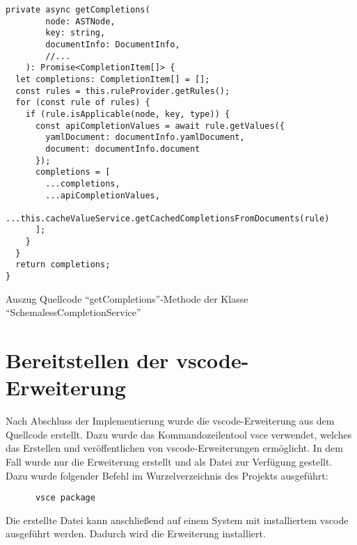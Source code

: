 \begin{listing}[t]
  \begin{verbatim}
private async getCompletions(
        node: ASTNode,
        key: string,
        documentInfo: DocumentInfo,
        //...
    ): Promise<CompletionItem[]> {
  let completions: CompletionItem[] = [];
  const rules = this.ruleProvider.getRules();
  for (const rule of rules) {
    if (rule.isApplicable(node, key, type)) {
      const apiCompletionValues = await rule.getValues({
        yamlDocument: documentInfo.yamlDocument,
        document: documentInfo.document
      });
      completions = [
        ...completions,
        ...apiCompletionValues,
        ...this.cacheValueService.getCachedCompletionsFromDocuments(rule)
      ];
    }
  }
  return completions;
}
      \end{verbatim}
  \caption{Auszug Quellcode ``getCompletions''-Methode der Klasse ``SchemalessCompletionService''}
  \label{lst:get-completions-schemaless-completion-service}
\end{listing}

\FloatBarrier

\section{Bereitstellen der \acs{vscode}-Erweiterung}

Nach Abschluss der Implementierung wurde die \acs{vscode}-Erweiterung aus dem Quellcode erstellt.
Dazu wurde das Kommandozeilentool \ac{vsce} verwendet, welches das Erstellen und veröffentlichen von
\acs{vscode}-Erweiterungen ermöglicht. In dem Fall wurde nur die Erweiterung erstellt und als
Datei zur Verfügung gestellt.
Dazu wurde folgender Befehl im Wurzelverzeichnis des Projekts ausgeführt:
\begin{verbatim}
      vsce package
\end{verbatim}
Die erstellte Datei kann anschließend auf einem System mit installiertem \ac{vscode} ausgeführt
werden. Dadurch wird die Erweiterung installiert.